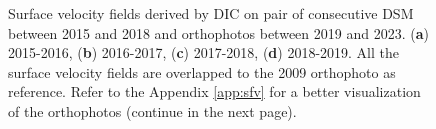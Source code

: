 \begin{figure}[!p]
{    }
    \caption{Surface velocity fields derived by DIC on pair of consecutive DSM between 2015 and 2018 and 
    orthophotos between 2019 and 2023. (\textbf{a}) 2015-2016, (\textbf{b}) 2016-2017, (\textbf{c}) 2017-2018, (\textbf{d}) 2018-2019.
    All the surface velocity fields are overlapped to the 2009 orthophoto \citep{Degaetani2021} as reference. Refer to the Appendix \ref{app:sfv} for a better visualization of the orthophotos  (continue in the next page).}
    \label{fig:3:dic_vel}
\end{figure}

\begin{figure}[!p]\ContinuedFloat
    \centering
\end{figure}

